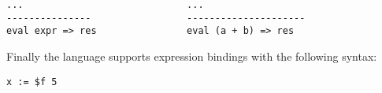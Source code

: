\begin{lstlisting}
...                             ...
---------------                 ---------------------
eval expr => res                eval (a + b) => res
\end{lstlisting} 

\noindent
Finally the language supports expression bindings with the following syntax:
\begin{lstlisting}
x := $f 5
\end{lstlisting}